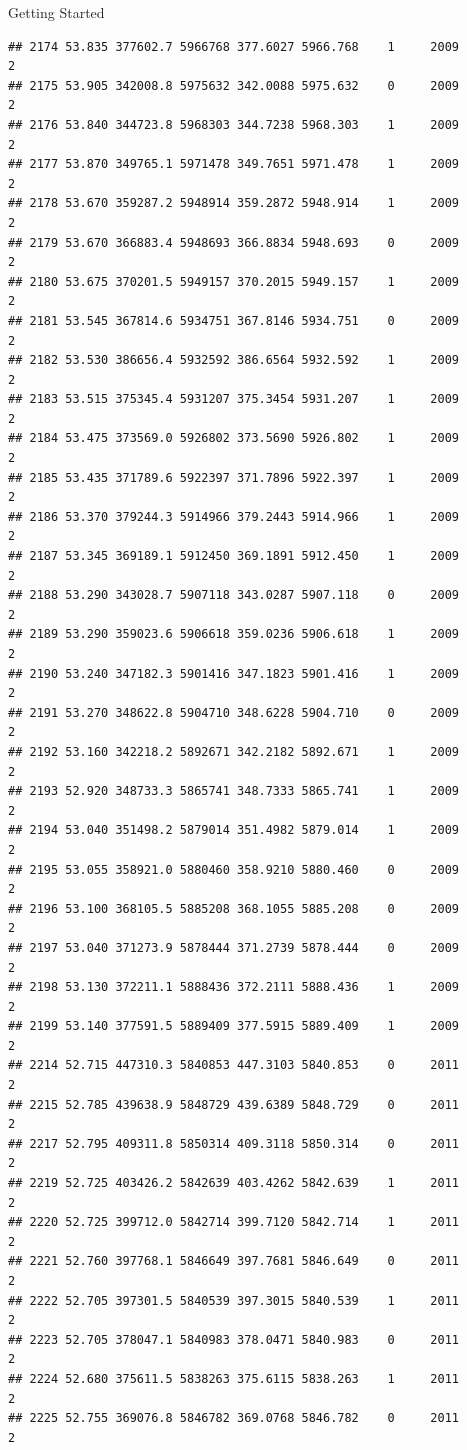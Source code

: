 \documentclass[
  ignorenonframetext,
]{beamer}
\begin{document}
\begin{frame}[fragile]{Getting Started}
\begin{verbatim}
## 2174 53.835 377602.7 5966768 377.6027 5966.768    1     2009        2
## 2175 53.905 342008.8 5975632 342.0088 5975.632    0     2009        2
## 2176 53.840 344723.8 5968303 344.7238 5968.303    1     2009        2
## 2177 53.870 349765.1 5971478 349.7651 5971.478    1     2009        2
## 2178 53.670 359287.2 5948914 359.2872 5948.914    1     2009        2
## 2179 53.670 366883.4 5948693 366.8834 5948.693    0     2009        2
## 2180 53.675 370201.5 5949157 370.2015 5949.157    1     2009        2
## 2181 53.545 367814.6 5934751 367.8146 5934.751    0     2009        2
## 2182 53.530 386656.4 5932592 386.6564 5932.592    1     2009        2
## 2183 53.515 375345.4 5931207 375.3454 5931.207    1     2009        2
## 2184 53.475 373569.0 5926802 373.5690 5926.802    1     2009        2
## 2185 53.435 371789.6 5922397 371.7896 5922.397    1     2009        2
## 2186 53.370 379244.3 5914966 379.2443 5914.966    1     2009        2
## 2187 53.345 369189.1 5912450 369.1891 5912.450    1     2009        2
## 2188 53.290 343028.7 5907118 343.0287 5907.118    0     2009        2
## 2189 53.290 359023.6 5906618 359.0236 5906.618    1     2009        2
## 2190 53.240 347182.3 5901416 347.1823 5901.416    1     2009        2
## 2191 53.270 348622.8 5904710 348.6228 5904.710    0     2009        2
## 2192 53.160 342218.2 5892671 342.2182 5892.671    1     2009        2
## 2193 52.920 348733.3 5865741 348.7333 5865.741    1     2009        2
## 2194 53.040 351498.2 5879014 351.4982 5879.014    1     2009        2
## 2195 53.055 358921.0 5880460 358.9210 5880.460    0     2009        2
## 2196 53.100 368105.5 5885208 368.1055 5885.208    0     2009        2
## 2197 53.040 371273.9 5878444 371.2739 5878.444    0     2009        2
## 2198 53.130 372211.1 5888436 372.2111 5888.436    1     2009        2
## 2199 53.140 377591.5 5889409 377.5915 5889.409    1     2009        2
## 2214 52.715 447310.3 5840853 447.3103 5840.853    0     2011        2
## 2215 52.785 439638.9 5848729 439.6389 5848.729    0     2011        2
## 2217 52.795 409311.8 5850314 409.3118 5850.314    0     2011        2
## 2219 52.725 403426.2 5842639 403.4262 5842.639    1     2011        2
## 2220 52.725 399712.0 5842714 399.7120 5842.714    1     2011        2
## 2221 52.760 397768.1 5846649 397.7681 5846.649    0     2011        2
## 2222 52.705 397301.5 5840539 397.3015 5840.539    1     2011        2
## 2223 52.705 378047.1 5840983 378.0471 5840.983    0     2011        2
## 2224 52.680 375611.5 5838263 375.6115 5838.263    1     2011        2
## 2225 52.755 369076.8 5846782 369.0768 5846.782    0     2011        2

\end{verbatim}
\end{frame}
\end{document}
